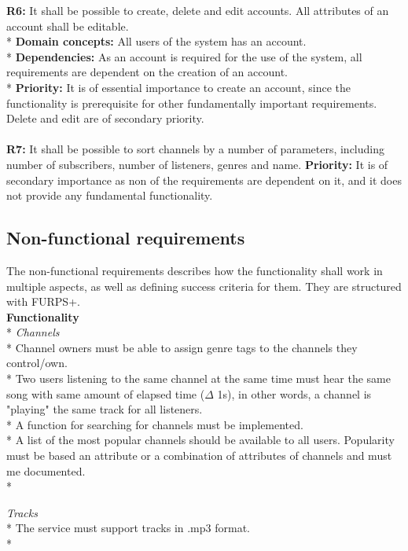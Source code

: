 \documentclass[a4paper,11pt,report]{article}
\begin{document}
\textbf{R6:}
It shall be possible to create, delete and edit accounts. All attributes of an account shall be editable. \\*
\textbf{Domain concepts:}
All users of the system has an account. \\*
\textbf{Dependencies:}
As an account is required for the use of the system, all requirements are dependent on the creation of an account. \\*
\textbf{Priority:} 
It is of essential importance to create an account, since the functionality is prerequisite for other fundamentally important requirements. Delete and edit are of secondary priority.
\\ \\

\textbf{R7:}
It shall be possible to sort channels by a number of parameters, including number of subscribers, number of listeners, genres and name.
\textbf{Priority:} 
It is of secondary importance as non of the requirements are dependent on it, and it does not provide any fundamental functionality.

\subsection{Non-functional requirements}
The non-functional requirements describes how the functionality shall work in multiple aspects, as well as defining success criteria for them. They are structured with FURPS+. \\

\textbf{Functionality} \\*
\textit{Channels} \\*
Channel owners must be able to assign genre tags to the channels they control/own. \\*
Two users listening to the same channel at the same time must hear the same song with same amount of elapsed time (\(\Delta\) 1s), in other words, a channel is "playing" the same track for all listeners. \\*
A function for searching for channels must be implemented. \\*
A list of the most popular channels should be available to all users. Popularity must be based an attribute or a combination of attributes of channels and must me documented. \\*

\textit{Tracks} \\*
The service must support tracks in .mp3 format. \\*
\end{document}
